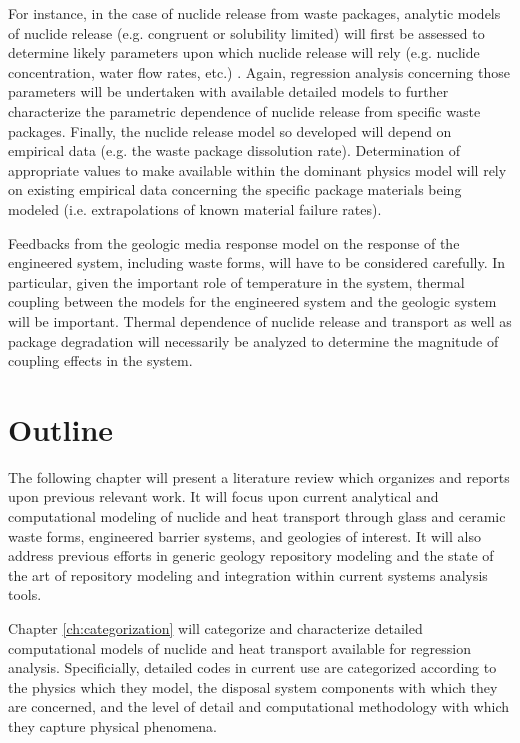 For instance, in the case of nuclide release from waste packages, 
analytic models of nuclide release (e.g.  congruent or solubility 
limited) will first be assessed to determine likely parameters upon 
which nuclide release will rely (e.g.  nuclide concentration, water 
flow rates, etc.) \cite{kawasaki_congruent_2004}.  Again, regression 
analysis concerning those parameters will be undertaken with available 
detailed models to further characterize the parametric dependence of 
nuclide release from specific waste packages.  Finally, the nuclide 
release model so developed will depend on empirical data (e.g. the 
waste package dissolution rate).  Determination of appropriate values 
to make available within the dominant physics model will rely on 
existing empirical data concerning the specific package materials 
being modeled (i.e.  extrapolations of known material failure rates).  

Feedbacks from the geologic media response model on the response of 
the engineered system, including waste forms, will have to be 
considered carefully.  In particular, given the important role of 
temperature in the system, thermal coupling between the models for the 
engineered system and the geologic system will be important. Thermal 
dependence of nuclide release and transport as well as package 
degradation will necessarily be analyzed to determine the magnitude of 
coupling effects in the system.


\section{Outline}

The following chapter will present a literature review which organizes 
and reports upon previous relevant work. It will focus upon current 
analytical and computational modeling of nuclide and heat transport 
through glass and ceramic waste forms, engineered barrier systems, and 
geologies of interest. It will also address previous efforts in 
generic geology repository modeling and the state of the art of 
repository modeling and integration within current systems analysis 
tools. 

Chapter \ref{ch:categorization} will categorize and characterize 
detailed computational models of nuclide and heat transport available 
for regression analysis. Specificially, detailed codes in current use 
are categorized according to the physics which they model, the 
disposal system components with which they are concerned, and the 
level of detail and computational methodology with which they capture 
physical phenomena. 

